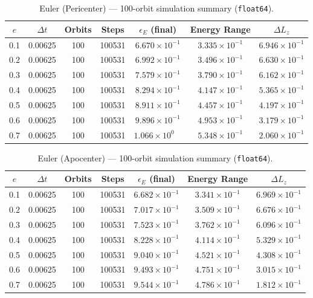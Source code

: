 \documentclass[twocolumn, 10pt]{article}
\begin{document}
\begin{table}[htbp]
\centering
\caption{Euler (Pericenter) --- 100-orbit simulation summary (\texttt{float64}).}
\label{tab:euler_peri}
\begin{tabular}{@{}ccccccc@{}}
\toprule
$e$ & $\Delta t$ & Orbits & Steps & $\epsilon_E$ (final) & Energy Range & $\Delta L_z$ \\
\midrule
0.1 & 0.00625 & 100 & 100531 & $6.670 \times 10^{-1}$ & $3.335 \times 10^{-1}$ & $6.946 \times 10^{-1}$ \\
0.2 & 0.00625 & 100 & 100531 & $6.992 \times 10^{-1}$ & $3.496 \times 10^{-1}$ & $6.630 \times 10^{-1}$ \\
0.3 & 0.00625 & 100 & 100531 & $7.579 \times 10^{-1}$ & $3.790 \times 10^{-1}$ & $6.162 \times 10^{-1}$ \\
0.4 & 0.00625 & 100 & 100531 & $8.294 \times 10^{-1}$ & $4.147 \times 10^{-1}$ & $5.365 \times 10^{-1}$ \\
0.5 & 0.00625 & 100 & 100531 & $8.911 \times 10^{-1}$ & $4.457 \times 10^{-1}$ & $4.197 \times 10^{-1}$ \\
0.6 & 0.00625 & 100 & 100531 & $9.896 \times 10^{-1}$ & $4.953 \times 10^{-1}$ & $3.179 \times 10^{-1}$ \\
0.7 & 0.00625 & 100 & 100531 & $1.066 \times 10^{0\phantom{-}}$  & $5.348 \times 10^{-1}$ & $2.060 \times 10^{-1}$ \\
\bottomrule
\end{tabular}
\end{table}

\begin{table}[htbp]
\centering
\caption{Euler (Apocenter) --- 100-orbit simulation summary (\texttt{float64}).}
\label{tab:euler_apo}
\begin{tabular}{@{}ccccccc@{}}
\toprule
$e$ & $\Delta t$ & Orbits & Steps & $\epsilon_E$ (final) & Energy Range & $\Delta L_z$ \\
\midrule
0.1 & 0.00625 & 100 & 100531 & $6.682 \times 10^{-1}$ & $3.341 \times 10^{-1}$ & $6.969 \times 10^{-1}$ \\
0.2 & 0.00625 & 100 & 100531 & $7.017 \times 10^{-1}$ & $3.509 \times 10^{-1}$ & $6.676 \times 10^{-1}$ \\
0.3 & 0.00625 & 100 & 100531 & $7.523 \times 10^{-1}$ & $3.762 \times 10^{-1}$ & $6.096 \times 10^{-1}$ \\
0.4 & 0.00625 & 100 & 100531 & $8.228 \times 10^{-1}$ & $4.114 \times 10^{-1}$ & $5.329 \times 10^{-1}$ \\
0.5 & 0.00625 & 100 & 100531 & $9.040 \times 10^{-1}$ & $4.521 \times 10^{-1}$ & $4.308 \times 10^{-1}$ \\
0.6 & 0.00625 & 100 & 100531 & $9.493 \times 10^{-1}$ & $4.751 \times 10^{-1}$ & $3.015 \times 10^{-1}$ \\
0.7 & 0.00625 & 100 & 100531 & $9.544 \times 10^{-1}$ & $4.786 \times 10^{-1}$ & $1.812 \times 10^{-1}$ \\
\bottomrule
\end{tabular}
\end{table}
\end{document}
